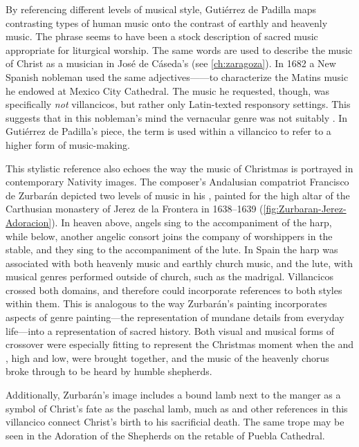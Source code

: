 By referencing different levels of musical style, Gutiérrez de Padilla maps
contrasting types of human music onto the contrast of earthly and heavenly
music.
The phrase  seems to have been a stock description
of sacred music appropriate for liturgical worship.%
    \Autocite
    [On  and other common vocabulary used for music in Spanish
    poetry, see][]{UribeBracho:OrfeoPhD}
The same words are used to describe the music of Christ as a musician in José
de Cáseda's  (see \cref{ch:zaragoza}).
In 1682 a New Spanish nobleman used the same adjectives------to characterize the Matins music he endowed at Mexico City
Cathedral.%
    \Autocite[140--141]{Goldman:Responsory}
The music he requested, though, was specifically \emph{not} villancicos, but
rather only Latin-texted responsory settings.
This suggests that in this nobleman's mind the vernacular genre was not suitably
.
In Gutiérrez de Padilla's piece, the term is used within a villancico to
refer to a higher form of music-making. 

This stylistic reference also echoes the way the music of Christmas is portrayed
in contemporary Nativity images.
The composer's Andalusian compatriot Francisco de Zurbarán depicted two levels
of music in his , painted for the high altar
of the Carthusian monastery of Jerez de la Frontera in 1638--1639
(\cref{fig:Zurbaran-Jerez-Adoracion}).%
    \Autocite
    [Gutiérrez de Padilla had been chapelmaster of the cathedral of Jerez de la
    Frontera in 1612--1616;][]
    {Gembero:Padilla}
In heaven above, angels sing to the accompaniment of the harp, while below,
another angelic consort joins the company of worshippers in the stable, and they
sing to the accompaniment of the lute.
In Spain the harp was associated with both heavenly music and earthly church
music, and the lute, with musical genres performed outside of church, such as
the madrigal.
Villancicos crossed both domains, and therefore could incorporate references to
both styles within them.
This is analogous to the way Zurbarán's painting incorporates aspects of genre
painting---the representation of mundane details from everyday life---into a
representation of sacred history.%
    \Autocites
    [31]{Sanchez:Zurbaran}
    {Cherry:Bodegon}
    {Haraszti-Takacs:Genre}
Both visual and musical forms of crossover were especially fitting to represent
the Christmas moment when the  and , high and low,
were brought together, and the music of the heavenly chorus broke through to be
heard by humble shepherds.%
\begin{Footnote}
    Additionally, Zurbarán's image includes a bound lamb next to the manger as a
    symbol of Christ's fate as the paschal lamb, much as  and other references in this villancico connect Christ's birth
    to his sacrificial death.
    The same trope may be seen in the Adoration of the Shepherds on the retable
    of Puebla Cathedral.
\end{Footnote}

